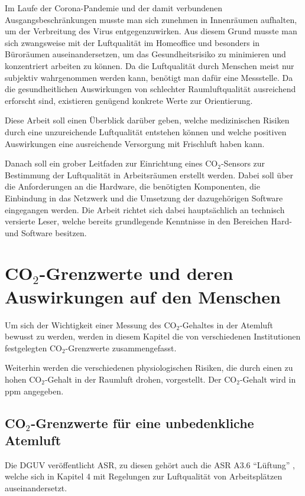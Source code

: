 \documentclass[a4paper,
    11pt,
    headings=small,
    ngerman,
    listof=totoc,
    numbers=noenddot]{scrreprt}[2021/11/13]
\begin{document}
Im Laufe der Corona-Pandemie und der damit verbundenen Ausgangsbeschränkungen musste man sich zunehmen in Innenräumen aufhalten, um der Verbreitung des Virus entgegenzuwirken. Aus diesem Grund musste man sich zwangsweise mit der Luftqualität im Homeoffice und besonders in Büroräumen auseinandersetzen, um das Gesundheitsrisiko zu minimieren und konzentriert arbeiten zu können. Da die Luftqualität durch Menschen meist nur subjektiv wahrgenommen werden kann, benötigt man dafür eine Messstelle. Da die gesundheitlichen Auswirkungen von schlechter Raumluftqualität ausreichend erforscht sind, existieren genügend konkrete Werte zur Orientierung.

Diese Arbeit soll einen Überblick darüber geben, welche medizinischen Risiken durch eine unzureichende Luftqualität entstehen können und welche positiven Auswirkungen eine ausreichende Versorgung mit Frischluft haben kann.

Danach soll ein grober Leitfaden zur Einrichtung eines CO$_2$-Sensors zur Bestimmung der Luftqualität in Arbeitsräumen erstellt werden. Dabei soll über die Anforderungen an die Hardware, die benötigten Komponenten, die Einbindung in das Netzwerk und die Umsetzung der dazugehörigen Software eingegangen werden. Die Arbeit richtet sich dabei hauptsächlich an technisch versierte Leser, welche bereits grundlegende Kenntnisse in den Bereichen Hard- und Software besitzen.


\chapter{CO\texorpdfstring{$_2$}{TEXT}-Grenzwerte und deren Auswirkungen auf den Menschen}\label{chapter:2}

Um sich der Wichtigkeit einer Messung des CO$_2$-Gehaltes in der Atemluft bewusst zu werden, werden in diesem Kapitel die von verschiedenen Institutionen festgelegten CO$_2$-Grenzwerte zusammengefasst.

Weiterhin werden die verschiedenen physiologischen Risiken, die durch einen zu hohen CO$_2$-Gehalt in der Raumluft drohen, vorgestellt. Der CO$_2$-Gehalt wird in \ac{ppm} angegeben.


\section{CO\texorpdfstring{$_2$}{TEXT}-Grenzwerte für eine unbedenkliche Atemluft}

Die \ac{DGUV} veröffentlicht \ac{ASR}, zu diesen gehört auch die \ac{ASR} A3.6 \enquote{Lüftung} \autocite{ASR}, welche sich in Kapitel 4 mit Regelungen zur Luftqualität von Arbeitsplätzen auseinandersetzt.
\end{document}
